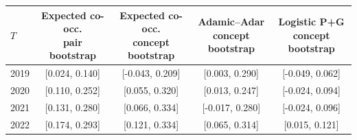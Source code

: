 \begin{tabular}{lcccc}
\toprule
$T$ & \shortstack{Expected co-occ.\\pair bootstrap} & \shortstack{Expected co-occ.\\concept bootstrap} & \shortstack{Adamic--Adar\\concept bootstrap} & \shortstack{Logistic P+G\\concept bootstrap}\\
\midrule
2019 & [0.024, 0.140] & [-0.043, 0.209] & [0.003, 0.290] & [-0.049, 0.062]\\
2020 & [0.110, 0.252] & [0.055, 0.320] & [0.013, 0.247] & [-0.024, 0.094]\\
2021 & [0.131, 0.280] & [0.066, 0.334] & [-0.017, 0.280] & [-0.024, 0.096]\\
2022 & [0.174, 0.293] & [0.121, 0.334] & [0.065, 0.314] & [0.015, 0.121]\\
\bottomrule
\end{tabular}